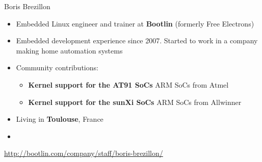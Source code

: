 \begin{frame}{Boris Brezillon}
    \begin{itemize}
	\item Embedded Linux engineer and trainer at {\bf Bootlin}
	      (formerly Free Electrons)
	\item Embedded development experience since 2007. Started
	      to work in a company making home automation systems
        \item Community contributions:
	\begin{itemize}
		\item {\bf Kernel support for the AT91 SoCs} ARM SoCs from Atmel
		\item {\bf Kernel support for the sunXi SoCs} ARM SoCs from Allwinner
	\end{itemize}
	\item Living in {\bf Toulouse}, France
	\item {}
    \end{itemize}
    {\small \url{http://bootlin.com/company/staff/boris-brezillon/}}
\end{frame}
